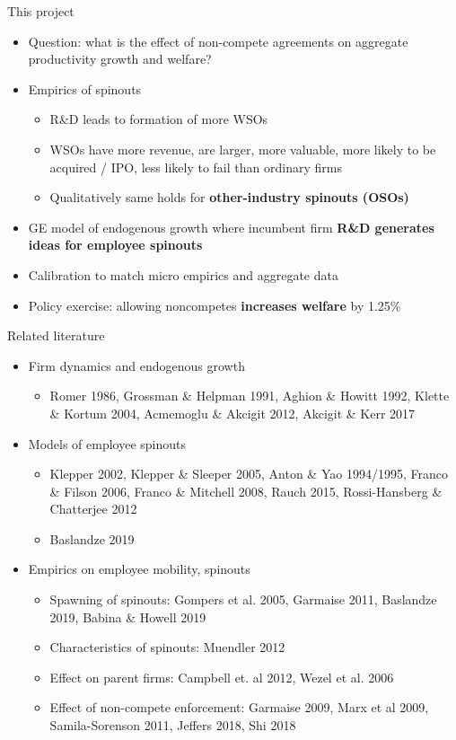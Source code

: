 \documentclass[english,usenames,dvipsnames]{beamer}
\begin{document}
\begin{frame}{This project}
\begin{itemize}
	\item Question: what is the effect of non-compete agreements on aggregate productivity growth and welfare?
	\item Empirics of spinouts
	\begin{itemize}
		\item R\&D leads to formation of more WSOs
		\item WSOs have more revenue, are larger, more valuable, more likely to be acquired / IPO, less likely to fail than ordinary firms
		\item Qualitatively same holds for \alert{\textbf{other-industry spinouts (OSOs)}}
	\end{itemize}
	\item GE model of endogenous growth where incumbent firm \alert{\textbf{R\&D generates ideas for employee spinouts}}
	\item Calibration to match micro empirics and aggregate data
	\item Policy exercise: allowing noncompetes \alert{\textbf{increases welfare}} by 1.25\% 
\end{itemize}
\end{frame}

\begin{frame}{Related literature}
\begin{itemize}
\item Firm dynamics and endogenous growth
\begin{itemize}
\item Romer 1986, Grossman \& Helpman 1991, Aghion \& Howitt 1992, Klette \& Kortum 2004, Acmemoglu \& Akcigit 2012, Akcigit \& Kerr 2017
\end{itemize}
\item Models of employee spinouts
\begin{itemize}
\item Klepper 2002, Klepper \& Sleeper 2005, Anton \& Yao 1994/1995, Franco \& Filson 2006, Franco \& Mitchell 2008, Rauch 2015, Rossi-Hansberg \& Chatterjee 2012
\item Baslandze 2019
\end{itemize}
\item Empirics on employee mobility, spinouts
\begin{itemize}
\item Spawning of spinouts: Gompers et al. 2005, Garmaise 2011, Baslandze 2019, Babina \& Howell 2019
\item Characteristics of spinouts: Muendler 2012
\item Effect on parent firms: Campbell et. al 2012, Wezel et al. 2006
\item Effect of non-compete enforcement: Garmaise 2009, Marx et al 2009, Samila-Sorenson 2011, Jeffers 2018, Shi 2018
\end{itemize}
\end{itemize}
\end{frame}
\end{document}
